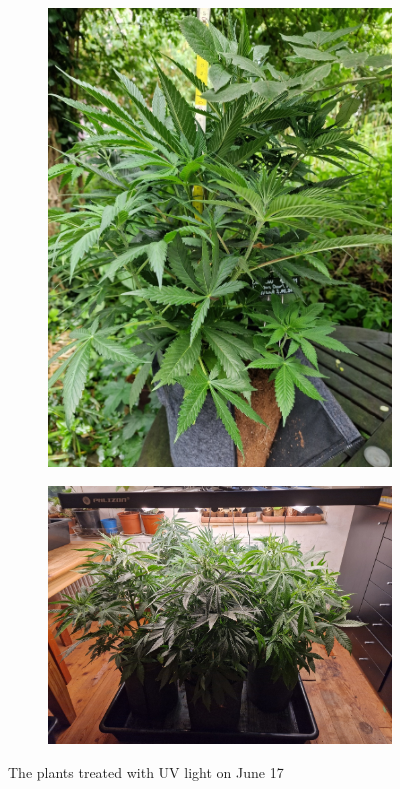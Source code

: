 \begin{figure}[htbp]
\begin{subfigure}[t]{.15\textwidth}
        \includegraphics[width=\linewidth]{plant_11_2024-06-17}
        \label{fig:plant_11_2024-06-17}
    \end{subfigure}
    \begin{subfigure}[t]{.31\textwidth}
        \includegraphics[width=\linewidth]{plant_uv_2024-06-17}
        \label{fig:plant_uv_2024-06-17}
    \end{subfigure}
    \caption[Plants of the UV group on June 17]{The plants treated with UV light on June 17}
    \label{fig:plants_uv_2024-06-17}
\end{figure}

